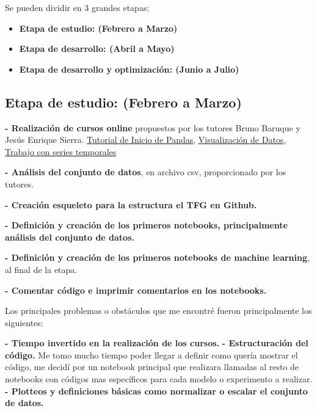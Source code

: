 



Se pueden dividir en 3 grandes etapas:

\begin{itemize}
\tightlist
\item
	\textbf{Etapa de estudio: (Febrero a Marzo)}   	
\item
 	\textbf{Etapa de desarrollo: (Abril a Mayo)} 
\item
	\textbf{Etapa de desarrollo y optimización: (Junio a Julio)} 
\end{itemize}





\subsection{Etapa de estudio: (Febrero a Marzo)}




\textbf{- Realización de cursos online} propuestos por los tutores Bruno Baruque y Jesús Enrique Sierra.
\href{https://www.kaggle.com/learn/pandas}{Tutorial de Inicio de Pandas}, \href{https://www.kaggle.com/learn/data-visualization}{Visualización de Datos}, \href{https://www.kaggle.com/learn/time-series}{Trabajo con series temporales}

\textbf{- Análisis del conjunto de datos}, en archivo csv, proporcionado por los tutores.

\textbf{- Creación esqueleto para la estructura el TFG en Github.}

\textbf{- Definición y creación de los primeros notebooks, principalmente análisis del conjunto de datos.}

\textbf{- Definición y creación de los primeros notebooks de machine learning}, al final de la etapa.

\textbf{- Comentar código e imprimir comentarios en los notebooks.}

Los principales problemas o obstáculos que me encontré fueron principalmente los siguientes:

\textbf{- Tiempo invertido en la realización de los cursos.}
\textbf{- Estructuración del código.} Me tomo mucho tiempo poder llegar a definir como quería mostrar el código, me decidí por un notebook principal que realizara llamadas al resto de notebooks con códigos mas específicos para cada modelo o experimento a realizar.
\textbf{- Plotteos y definiciones básicas como normalizar o escalar el conjunto de datos.}



